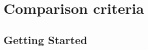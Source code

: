 \chapter{Comparison criteria}
\label{cha:WorkingWithLatex}

% 
\section{Getting Started}
\label{sec:LatexGettingStarted}




